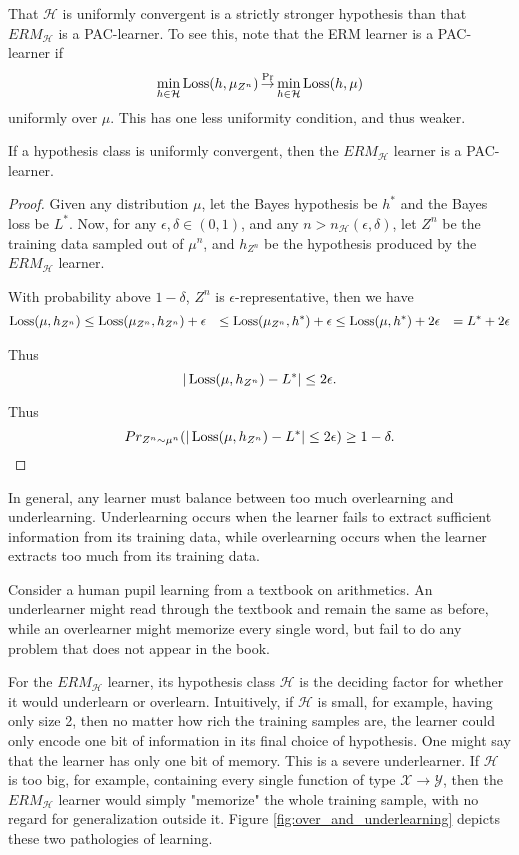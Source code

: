 That $\mathcal{H}$ is uniformly convergent is a strictly stronger hypothesis than that $ERM_\mathcal{H}$ is a  PAC-learner. To see this, note that the ERM learner is a PAC-learner if
$$\min_{h\in \mathcal{H}} \operatorname{Loss}(h, \mu_{Z^n} ) \operatorname*{\stackrel{\text {Pr}}{\to}} \min_{h\in \mathcal{H}} \operatorname{Loss}(h, \mu)$$
uniformly over $\mu$. This has one less uniformity condition, and thus weaker.

\begin{prop}
\label{prop:uniconv}
If a hypothesis class is uniformly convergent, then the $ERM_\mathcal{H}$ learner is a PAC-learner.
\end{prop}
\begin{proof}
Given any distribution $\mu$, let the Bayes hypothesis be $h^*$ and the Bayes loss be $L^*$. Now, for any $\epsilon, \delta \in (0, 1)$, and any $n > n_{\mathcal{H}}(\epsilon, \delta)$, let $Z^n$ be the training data sampled out of $\mu^n$, and $h_{Z^n}$ be the hypothesis produced by the $ERM_{\mathcal{H}}$ learner.

With probability above $1- \delta$, $Z^n$ is $\epsilon$-representative, then we have 
\begin{align*}
\operatorname{Loss}(\mu, h_{Z^n}) &\le \operatorname{Loss}(\mu_{Z^n}, h_{Z^n}) + \epsilon 
&\le \operatorname{Loss}(\mu_{Z^n}, h^*) + \epsilon  
&\le \operatorname{Loss}(\mu, h^*) + 2\epsilon 
&= L^* + 2\epsilon
\end{align*}

Thus 
$$|\operatorname{Loss}(\mu, h_{Z^n}) - L^*| \le  2\epsilon.$$

Thus
$$Pr_{Z^n\sim \mu^n}(|\operatorname{Loss}(\mu, h_{Z^n}) - L^*| \le  2\epsilon) \ge 1-\delta.$$
\end{proof}

In general, any learner must balance between too much overlearning and underlearning. Underlearning occurs when the learner fails to extract sufficient information from its training data, while overlearning occurs when the learner extracts too much from its training data.

Consider a human pupil learning from a textbook on arithmetics. An underlearner might read through the textbook and remain the same as before, while an overlearner might memorize every single word, but fail to do any problem that does not appear in the book.

For the $ERM_{\mathcal{H}}$ learner, its hypothesis class $\mathcal{H}$ is the deciding factor for whether it  would underlearn or overlearn. Intuitively, if $\mathcal{H}$ is small, for example, having only size 2, then no matter how rich the training samples are, the learner could only encode one bit of information in its final choice of hypothesis. One might say that the learner has only one bit of memory. This is a severe underlearner. If $\mathcal{H}$ is too big, for example, containing every single function of type $\mathcal{X}\to\mathcal{Y}$, then the $ERM_{\mathcal{H}}$ learner would simply "memorize" the whole training sample, with no regard for generalization outside it. Figure \ref{fig:over_and_underlearning} depicts these two pathologies of learning.

